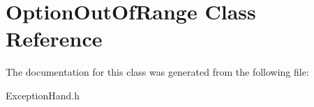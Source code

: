 \hypertarget{class_option_out_of_range}{}\section{Option\+Out\+Of\+Range Class Reference}
\label{class_option_out_of_range}


The documentation for this class was generated from the following file\+:\begin{DoxyCompactItemize}
\item 
Exception\+Hand.\+h\end{DoxyCompactItemize}
